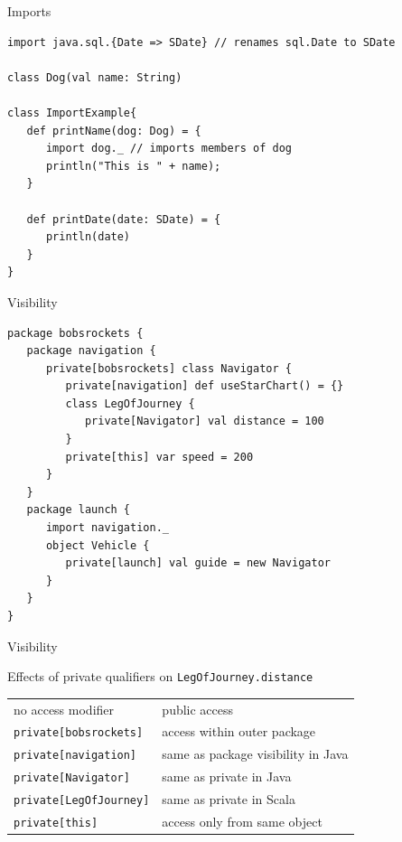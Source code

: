 \begin{frame}[fragile]{Imports}
\begin{lstlisting}
import java.sql.{Date => SDate} // renames sql.Date to SDate

class Dog(val name: String)

class ImportExample{
   def printName(dog: Dog) = {
      import dog._ // imports members of dog
      println("This is " + name);
   }
   
   def printDate(date: SDate) = {
      println(date)
   }
}
\end{lstlisting}
\end{frame}

\begin{frame}[fragile]{Visibility}
\begin{lstlisting}
package bobsrockets {
   package navigation {
      private[bobsrockets] class Navigator {
         private[navigation] def useStarChart() = {}
         class LegOfJourney {
            private[Navigator] val distance = 100
         }
         private[this] var speed = 200
      }
   }
   package launch {
      import navigation._
      object Vehicle {
         private[launch] val guide = new Navigator
      }
   }
}
\end{lstlisting}
\end{frame}

\begin{frame}[fragile]{Visibility}
\begin{block}{Effects of private qualifiers on \lstinline!LegOfJourney.distance!}
\begin{tabular}{l|l}
no access modifier & public access \\
\lstinline!private[bobsrockets]! & access within outer package \\
\lstinline!private[navigation]! & same as package visibility in Java \\
\lstinline!private[Navigator]! & same as private in Java \\
\lstinline!private[LegOfJourney]! & same as private in Scala \\
\lstinline!private[this]! & access only from same object \\
\end{tabular}
\end{block}
\end{frame}

